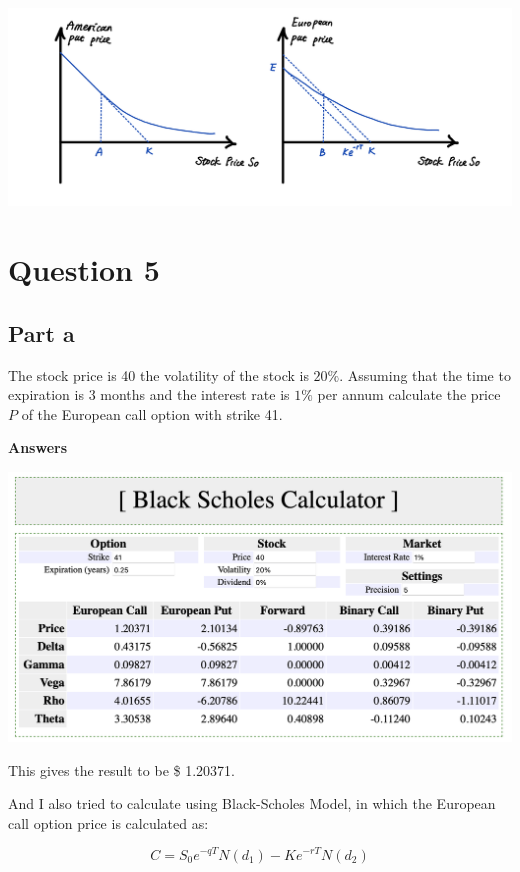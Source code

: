 \documentclass[letterpaper]{article}
\begin{document}
			\includegraphics[max width=\textwidth, center]{Q4}
		
		\pagebreak
		
		\section{Question 5}
		\subsection{Part a}
		
		The stock price is 40 the volatility of the stock is $20 \%$. Assuming that the time to expiration is 3 months and the interest rate is $1 \%$ per annum calculate the price $P$ of the European call option with strike 41.
		
		\textbf{Answers}
		
		\includegraphics[max width=\textwidth, center]{Q5_2}
		
		This gives the result to be \$ 1.20371.
		
		And I also tried to calculate using Black-Scholes Model, in which the European call option price is calculated as:
		
		$$
		C=S_0e^{-qT}N(d_1)-Ke^{-rT}N(d_2)
		$$
		
\end{document}
